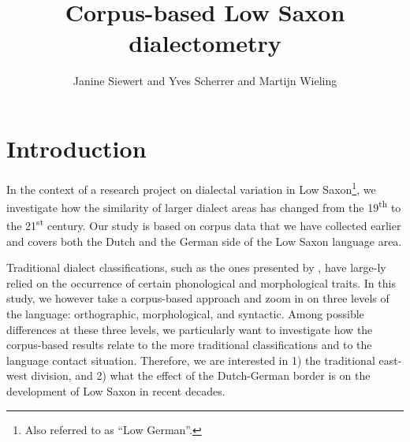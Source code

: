 \documentclass[output=paper,colorlinks,citecolor=brown]{langscibook}
\author{Janine Siewert\orcid{}\affiliation{University of Helsinki} and
        Yves Scherrer\orcid{}\affiliation{University of Helsinki; University of Oslo} and
        Martijn Wieling\orcid{}\affiliation{University of Groningen}}
\title{Corpus-based Low Saxon dialectometry}
\begin{document}
\graphicspath{{figures/siewert}}
\maketitle
\label{chap:siewert}

\section{Introduction}
In the context of a research project on dialectal variation in Low Saxon\footnote{Also referred to as “Low German”.}, we investigate how the similarity of larger dialect areas has changed from the 19\textsuperscript{th} to the 21\textsuperscript{st} century. Our study is based on corpus data that we have collected earlier and covers both the Dutch and the German side of the Low Saxon language area. 

\begin{sloppypar}
Traditional dialect classifications, such as the ones presented by \citet{Schroeder2004},
have large\hyp ly relied on the occurrence of certain phonological and morphological traits. In this study, we however take a corpus-based approach and zoom in on three levels of the language: orthographic, morphological, and syntactic. Among possible differences at these three levels, we particularly want to investigate how the corpus-based results relate to the more traditional classifications and to the language contact situation. Therefore, we are interested in 1) the traditional east-west division, and 2) what the effect of the Dutch-German border is on the development of Low Saxon in recent decades.
\end{sloppypar}



\end{document}
